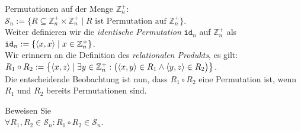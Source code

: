 Permutationen auf der Menge $\mathbb{Z}_n^+$:
\\[0.2cm]
\hspace*{1.3cm}
$\mathcal{S}_n := \{ R \subseteq \mathbb{Z}_n^+ \times \mathbb{Z}_n^+ \mid \mbox{$R$ ist Permutation auf $\mathbb{Z}_n^+$} \}$.
\\[0.2cm]
Weiter definieren wir die \emph{\color{blue}identische Permutation} $\mathtt{id}_n$ auf $\mathbb{Z}_n^+$ als
\\[0.2cm]
\hspace*{1.3cm}
$\mathtt{id}_n := \{ \pair(x,x) \mid x \in \mathbb{Z}_n^+ \}$.
\\[0.2cm]
Wir erinnern an die Definition des \emph{\color{blue}relationalen Produkts}, es gilt:
\\[0.2cm]
\hspace*{1.3cm}
$R_1 \circ R_2 := \bigl\{ \pair(x,z) \mid \exists y \in \mathbb{Z}_n^+:\bigl( \pair(x,y) \in R_1 \wedge \pair(y,z) \in R_2\bigr) \bigl\}$.
\\[0.2cm]
Die entscheidende Beobachtung ist nun, dass $R_1 \circ R_2$ eine Permutation ist, wenn $R_1$ und $R_2$
bereits Permutationen sind.

\exercise
Beweisen Sie
\\[0.2cm]
\hspace*{1.3cm}
$\forall R_1, R_2 \in \mathcal{S}_n: R_1 \circ R_2 \in \mathcal{S}_n$.
\exend


